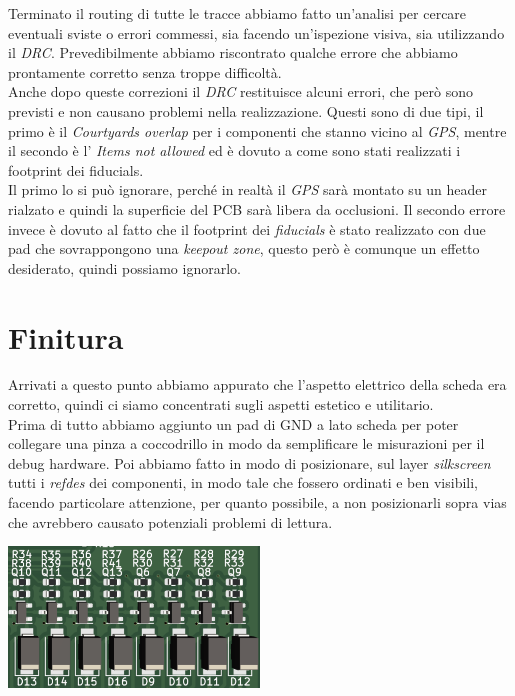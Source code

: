 \noindent Terminato il routing di tutte le tracce abbiamo fatto un'analisi per
cercare eventuali sviste o errori commessi, sia facendo un'ispezione
visiva, sia utilizzando il \textit{DRC}. Prevedibilmente abbiamo riscontrato
qualche errore che abbiamo prontamente corretto senza troppe difficoltà.\\
Anche dopo queste correzioni il \textit{DRC} restituisce alcuni errori, che però
sono previsti e non causano problemi nella realizzazione. Questi sono di
due tipi, il primo è il \emph{Courtyards overlap} per i componenti che
stanno vicino al \textit{GPS}, mentre il secondo è l' \emph{Items not allowed} ed
è dovuto a come sono stati realizzati i footprint dei fiducials.\\
Il primo lo si può ignorare, perché in realtà il \textit{GPS} sarà montato su un
header rialzato e quindi la superficie del PCB sarà libera da
occlusioni. Il secondo errore invece è dovuto al fatto che il footprint
dei \textit{fiducials} è stato realizzato con due pad che sovrappongono una
\emph{keepout zone}, questo però è comunque un effetto desiderato,
quindi possiamo ignorarlo.

\hypertarget{finitura}{%
\section{Finitura}\label{finitura}}

\noindent Arrivati a questo punto abbiamo appurato che l'aspetto elettrico della
scheda era corretto, quindi ci siamo concentrati sugli aspetti estetico
e utilitario.\\
Prima di tutto abbiamo aggiunto un pad di GND a lato scheda per poter
collegare una pinza a coccodrillo in modo da semplificare le misurazioni
per il debug hardware. Poi abbiamo fatto in modo di posizionare, sul
layer \textit{silkscreen} tutti i \textit{refdes} dei componenti, in modo tale che fossero
ordinati e ben visibili, facendo particolare attenzione, per quanto
possibile, a non posizionarli sopra vias che avrebbero causato
potenziali problemi di lettura.

\begin{center}
\includegraphics[width=0.5\textwidth]{figures/image100.png}
\captionsetup{type=figure}
\end{center}

